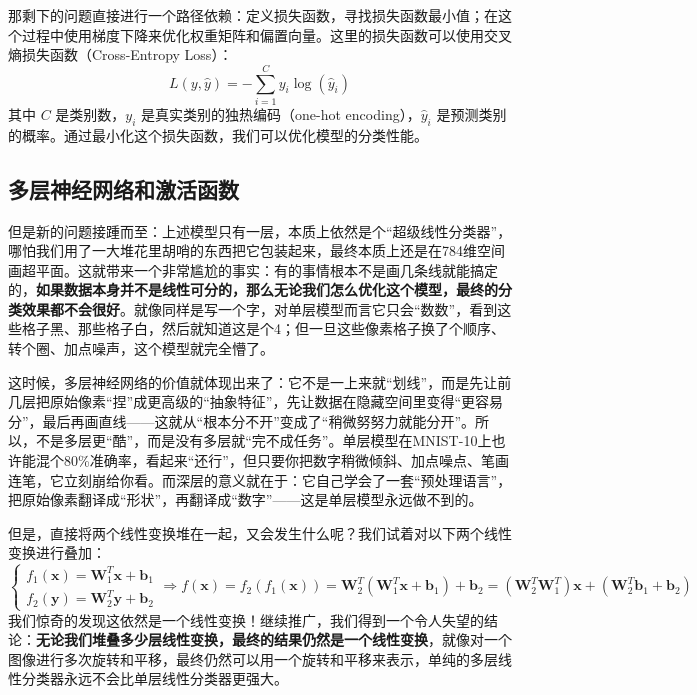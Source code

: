 那剩下的问题直接进行一个路径依赖：定义损失函数，寻找损失函数最小值；在这个过程中使用梯度下降来优化权重矩阵和偏置向量。这里的损失函数可以使用交叉熵损失函数（Cross-Entropy Loss）：
\[ L(y, \hat{y}) = -\sum_{i=1}^{C} y_i \log(\hat{y}_i) \]
其中 $C$ 是类别数，$y_i$ 是真实类别的独热编码（one-hot encoding），$\hat{y}_i$ 是预测类别的概率。通过最小化这个损失函数，我们可以优化模型的分类性能。

\subsection{多层神经网络和激活函数}

但是新的问题接踵而至：上述模型只有一层，本质上依然是个“超级线性分类器”，哪怕我们用了一大堆花里胡哨的东西把它包装起来，最终本质上还是在784维空间画超平面。这就带来一个非常尴尬的事实：有的事情根本不是画几条线就能搞定的，\textbf{如果数据本身并不是线性可分的，那么无论我们怎么优化这个模型，最终的分类效果都不会很好}。就像同样是写一个字，对单层模型而言它只会“数数”，看到这些格子黑、那些格子白，然后就知道这是个4；但一旦这些像素格子换了个顺序、转个圈、加点噪声，这个模型就完全懵了。

这时候，多层神经网络的价值就体现出来了：它不是一上来就“划线”，而是先让前几层把原始像素“捏”成更高级的“抽象特征”，先让数据在隐藏空间里变得“更容易分”，最后再画直线——这就从“根本分不开”变成了“稍微努努力就能分开”。所以，不是多层更“酷”，而是没有多层就“完不成任务”。单层模型在MNIST-10上也许能混个80\%准确率，看起来“还行”，但只要你把数字稍微倾斜、加点噪点、笔画连笔，它立刻崩给你看。而深层的意义就在于：它自己学会了一套“预处理语言”，把原始像素翻译成“形状”，再翻译成“数字”——这是单层模型永远做不到的。

但是，直接将两个线性变换堆在一起，又会发生什么呢？我们试着对以下两个线性变换进行叠加：
\[ \begin{cases}
    f_1(\mathbf{x}) = \mathbf{W}_1^T \mathbf{x} + \mathbf{b}_1 \\
    f_2(\mathbf{y}) = \mathbf{W}_2^T \mathbf{y} + \mathbf{b}_2
\end{cases}
\Rightarrow
f(\mathbf{x}) = f_2(f_1(\mathbf{x})) = \mathbf{W}_2^T (\mathbf{W}_1^T \mathbf{x} + \mathbf{b}_1) + \mathbf{b}_2 = (\mathbf{W}_2^T \mathbf{W}_1^T) \mathbf{x} + (\mathbf{W}_2^T \mathbf{b}_1 + \mathbf{b}_2) \]
我们惊奇的发现这依然是一个线性变换！继续推广，我们得到一个令人失望的结论：\textbf{无论我们堆叠多少层线性变换，最终的结果仍然是一个线性变换}，就像对一个图像进行多次旋转和平移，最终仍然可以用一个旋转和平移来表示，单纯的多层线性分类器永远不会比单层线性分类器更强大。


